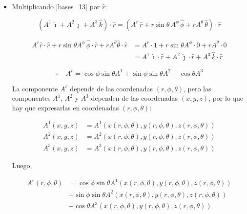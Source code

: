 \documentclass[../apunte_mecanica_clasica.tex]{subfiles}%
\begin{document}
\begin{itemize}
    \item  Multiplicando \eqref{bases_13} por $\hat{r}$:

\begin{equation*}
\left(A^1\, \hat{\imath} + A^2\, \hat{\jmath} + A^3\, \hat{k} \right)\cdot \hat{r} = \left(A^r\, \hat{r} + r \sin \theta\, A^\phi\, \hat{\phi} + r A^\theta\, \hat{\theta}\right) \cdot \hat{r}
\end{equation*}

\begin{equation*}
\begin{aligned}
A^r \hat{r} \cdot \hat{r} + r \sin \theta A^\phi\, \hat{\phi} \cdot \hat{r} + r A^\theta \hat{\theta} \cdot \hat{r} &= A^r \cdot 1 + r \sin \theta A^\phi \cdot 0 + r A^\theta \cdot 0 \\
&=A^1\, \hat{\imath} \cdot \hat{r} + A^2\, \hat{\jmath} \cdot \hat{r} + A^3\, \hat{k} \cdot \hat{r}    
\end{aligned}
\end{equation*}

\begin{equation*}
\therefore \quad A^r = \cos \phi \sin \theta A^1 + \sin \phi \sin \theta A^2 + \cos \theta A^3
\end{equation*}

La componente $A^r$ depende de las coordenadas $(r, \phi, \theta)$, pero las componentes $A^1$, $A^2$ y $A^3$ dependen de las coordenadas $(x, y, z)$, por lo que hay que expresarlas en coordenadas $(r, \phi, \theta)$:

\begin{equation*}
\begin{aligned}
A^1(x, y, z) &= A^1(x(r, \phi, \theta), y(r, \phi, \theta), z(r, \phi, \theta)) \\
A^2(x, y, z) &= A^2(x(r, \phi, \theta), y(r, \phi, \theta), z(r, \phi, \theta)) \\
A^3(x, y, z) &= A^3(x(r, \phi, \theta), y(r, \phi, \theta), z(r, \phi, \theta))    
\end{aligned}
\end{equation*}

Luego,

\begin{equation*}
\begin{aligned}
A^r(r, \phi, \theta) &= \cos \phi \sin \theta A^1(x(r, \phi, \theta), y(r, \phi, \theta), z(r, \phi, \theta)) \\
&+ \sin \phi \sin \theta A^2(x(r, \phi, \theta), y(r, \phi, \theta), z(r, \phi, \theta)) \\
&+ \cos \theta A^3(x(r, \phi, \theta), y(r, \phi, \theta), z(r, \phi, \theta))    
\end{aligned}
\end{equation*}


\end{itemize}
\end{document}
